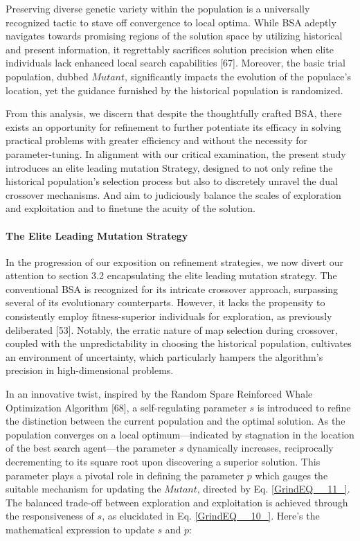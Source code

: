 \documentclass{article} %
\begin{document}
Preserving diverse genetic variety within the population is a universally recognized tactic to stave off convergence to local optima. While BSA adeptly navigates towards promising regions of the solution space by utilizing historical and present information, it regrettably sacrifices solution precision when elite individuals lack enhanced local search capabilities [67]. Moreover, the basic trial population, dubbed $Mutant$, significantly impacts the evolution of the populace's location, yet the guidance furnished by the historical population is randomized.

From this analysis, we discern that despite the thoughtfully crafted BSA, there exists an opportunity for refinement to further potentiate its efficacy in solving practical problems with greater efficiency and without the necessity for parameter-tuning. In alignment with our critical examination, the present study introduces an elite leading mutation Strategy, designed to not only refine the historical population's selection process but also to discretely unravel the dual crossover mechanisms. And aim to judiciously balance the scales of exploration and exploitation and to finetune the acuity of the solution.


\paragraph{ The Elite Leading Mutation Strategy}

 In the progression of our exposition on refinement strategies, we now divert our attention to section 3.2 encapsulating the elite leading mutation strategy. The conventional BSA is recognized for its intricate crossover approach, surpassing several of its evolutionary counterparts. However, it lacks the propensity to consistently employ fitness-superior individuals for exploration, as previously deliberated [53]. Notably, the erratic nature of map selection during crossover, coupled with the unpredictability in choosing the historical population, cultivates an environment of uncertainty, which particularly hampers the algorithm's precision in high-dimensional problems.

 In an innovative twist, inspired by the Random Spare Reinforced Whale Optimization Algorithm [68], a self-regulating parameter $s$ is introduced to refine the distinction between the current population and the optimal solution. As the population converges on a local optimum---indicated by stagnation in the location of the best search agent---the parameter $s$ dynamically increases, reciprocally decrementing to its square root upon discovering a superior solution. This parameter plays a pivotal role in defining the parameter $p$ which gauges the suitable mechanism for updating the $Mutant$, directed by Eq. \eqref{GrindEQ__11_}. The balanced trade-off between exploration and exploitation is achieved through the responsiveness of $s$, as elucidated in Eq. \eqref{GrindEQ__10_}. Here's the mathematical expression to update $s$ and $p$:
\end{document}
